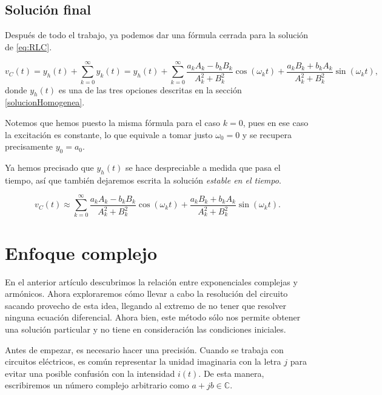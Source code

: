 \subsection{Solución final}
Después de todo el trabajo, ya podemos dar una fórmula cerrada para la solución de \eqref{eq:RLC}.
\begin{mybox} \vspace{-4mm}
  \begin{equation}
    \label{eq:SolucionRLC}
    v_C(t) = y_h(t) + \sum _{k=0}^{\infty} y_k (t) = y_h(t) +  \sum _{k=0}^{\infty}  \frac{a_kA_k-b_kB_k}{A_k^2+B_k^2}\cos(\omega_kt) + \frac{a_kB_k + b_kA_k}{A_k^2+B_k^2}\sin(\omega_kt),
  \end{equation}
  donde $y_h(t)$ es una de las tres opciones descritas en la sección \ref{solucionHomogenea}.
\end{mybox}

Notemos que hemos puesto la misma fórmula para el caso $k=0$, pues en ese caso la excitación es constante, lo que equivale a tomar justo $\omega_0=0$ y se recupera precisamente $y_0=a_0$.

Ya hemos precisado que $y_h(t)$ se hace despreciable a medida que pasa el tiempo, así que también dejaremos escrita la solución \textit{estable en el tiempo}.

\begin{mybox} \vspace{-4mm}
  \begin{equation}
    \label{eq:SolucionRLC2}
    v_C(t) \approx \sum _{k=0}^{\infty}  \frac{a_kA_k-b_kB_k}{A_k^2+B_k^2}\cos(\omega_kt) + \frac{a_kB_k + b_kA_k}{A_k^2+B_k^2}\sin(\omega_kt).
  \end{equation}
\end{mybox}


\section{Enfoque complejo}

En el anterior artículo descubrimos la relación entre exponenciales complejas y armónicos. Ahora exploraremos cómo llevar a cabo la resolución del circuito sacando provecho de esta idea, llegando al extremo de no tener que resolver ninguna ecuación diferencial. Ahora bien, este método sólo nos permite obtener una solución particular y no tiene en consideración las condiciones iniciales.

Antes de empezar, es necesario hacer una precisión. Cuando se trabaja con circuitos eléctricos, es común representar la unidad imaginaria con la letra $j$ para evitar una posible confusión con la intensidad $i(t)$. De esta manera, escribiremos un número complejo arbitrario como $a+jb\in\mathbb{C}$.

